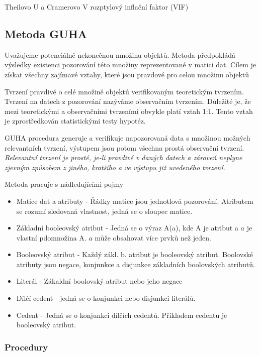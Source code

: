 \newpage
Theilovo U a Cramerovo V
rozptylový inflační faktor (VIF)

\subsection{Metoda GUHA}
\label{sec:Teorie:Guha}
Uvažujeme potenciálně nekonečnou množinu objektů. Metoda předpokládá výsledky existenci pozorování této množiny reprezentované v matici dat. Cílem je získat všechny zajímavé vztahy, které jsou pravdové pro celou množinu objektů

Tvrzení pravdivé o celé množině objektů verifikovaným teoretickým tvrzením. Tvrzení na datech z pozorování nazýváme observačním tvrzením. Důležité je, že mezi teoretickými a observačními tvrzeními obvykle platí vztah 1:1. Tento vztah je zprostředkován statistickými testy hypotéz.

GUHA procedura generuje a verifikuje napozorovaná data s množinou možných relevantních tvrzení, výstupem jsou potom všechna prostá observační tvrzení. \textit{Relevantní tvrzení je prosté, je-li pravdivé v daných datech a zároveň neplyne zjevným způsobem z jiného, kratšího a ve výstupu již uvedeného tvrzení.} %

Metoda pracuje s nádledujícími pojmy

\begin{itemize}
    \item Matice dat a atributy - Řádky matice jsou jednotlová pozorování. Atributem se rozumí sledovaná vlastnost, jedná se o sloupec matice.
    \item Základní booleovský atribut - Jedná se o výraz A(a), kde A je atribut a $a$ je vlastní pdomnožina A. $a$ může obsahovat více prvků než jeden.
    \item Booleovský atribut -  Každý zákl. b. atribut je booleovský atribut. Boolovské atributy jsou negace, konjunkce a disjunkce základních boolovských atributů.
    \item Literál - Zákaldní boolovský atribut nebo jeho negace
    \item Dílčí cedent - jedná se o konjunkci nebo disjunkci literálů.
    \item Cedent - Jedná se o konjunkci dílčích cedentů. Příkladem cedentu je booleovský atribut.
\end{itemize}

\subsubsection*{Procedury}

